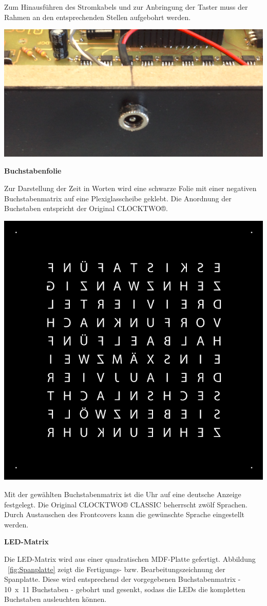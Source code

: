 \begin{multicols}{2}
{}
Zum Hinausführen des Stromkabels und zur Anbringung der Taster muss der Rahmen an den entsprechenden Stellen aufgebohrt werden. 

{
\centering \includegraphics[width=0.5\columnwidth]{Abbildungen/Konstruktion/Stecker01}

}



\textbf{Buchstabenfolie}

Zur Darstellung der Zeit in Worten wird eine schwarze Folie mit einer negativen Buchstabenmatrix auf eine Plexiglasscheibe geklebt. Die Anordnung der Buchstaben entspricht der Original CLOCKTWO®. 

{
\centering\includegraphics[width=0.75\columnwidth]{Abbildungen/Konstruktion/Buchstaben}

}
Mit der gewählten Buchstabenmatrix ist die Uhr auf eine deutsche Anzeige festgelegt. Die Original CLOCKTWO® CLASSIC beherrscht zwölf Sprachen. Durch Austauschen des Frontcovers kann die gewünschte Sprache eingestellt werden. 

\textbf{LED-Matrix}

Die LED-Matrix wird aus einer quadratischen MDF-Platte gefertigt. Abbildung ~\ref{fig:Spanplatte} zeigt die Fertigungs- bzw. Bearbeitungszeichnung der Spanplatte. Diese wird entsprechend der vorgegebenen Buchstabenmatrix -  10~x~11 Buchstaben - gebohrt und gesenkt, sodass die LEDs die kompletten Buchstaben ausleuchten können. 


\end{multicols}

